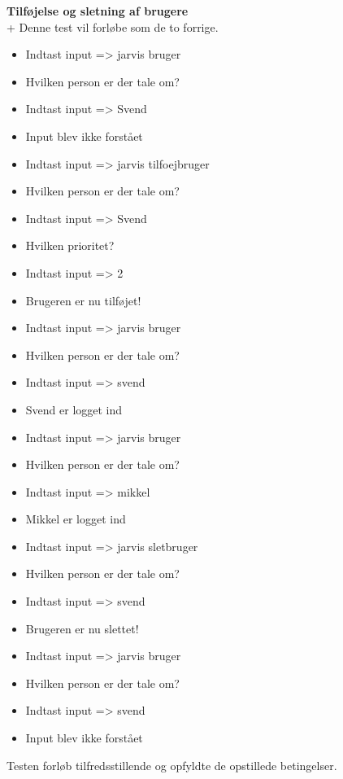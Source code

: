 {\bf Tilføjelse og sletning af brugere}\\+
Denne test vil forløbe som de to forrige.
\begin{itemize}[itemsep=0ex,topsep=1ex]
    \item Indtast input => jarvis bruger
    \item Hvilken person er der tale om?
    \item Indtast input => Svend
    \item Input blev ikke forstået
    \item Indtast input => jarvis tilfoejbruger
    \item Hvilken person er der tale om?
    \item Indtast input => Svend
    \item Hvilken prioritet?
    \item Indtast input => 2
    \item Brugeren er nu tilføjet!
    \item Indtast input => jarvis bruger
    \item Hvilken person er der tale om?
    \item Indtast input => svend
    \item Svend er logget ind
    \item Indtast input => jarvis bruger
    \item Hvilken person er der tale om?
    \item Indtast input => mikkel
    \item Mikkel er logget ind
    \item Indtast input => jarvis sletbruger
    \item Hvilken person er der tale om?
    \item Indtast input => svend
    \item Brugeren er nu slettet!
    \item Indtast input => jarvis bruger
    \item Hvilken person er der tale om?
    \item Indtast input => svend
    \item Input blev ikke forstået
\end{itemize}
Testen forløb tilfredsstillende og opfyldte de opstillede betingelser.\\

